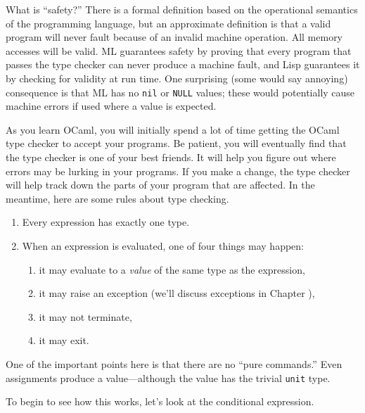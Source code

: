 What is ``safety?''  There is a formal definition based on the
operational semantics of the programming language, but an approximate
definition is that a valid program will never fault because of an
invalid machine operation.  All memory accesses will be valid.  ML
guarantees safety by proving that every program that passes the type
checker can never produce a machine fault, and Lisp guarantees it by
checking for validity at run time.  One surprising (some would say
annoying) consequence is that ML has no \hbox{\lstinline/nil/} or \hbox{\lstinline/NULL/}
values; these would potentially cause machine errors if used where
a value is expected.

As you learn OCaml, you will initially spend a lot of time getting the
OCaml type checker to accept your programs.  Be patient, you will
eventually find that the type checker is one of your best friends.  It
will help you figure out where errors may be lurking in your programs.
If you make a change, the type checker will help track down the parts
of your program that are affected.  In the meantime, here are some
rules about type checking.

\begin{enumerate}

\item{Every expression has exactly one type.}

\item{When an expression is evaluated, one of four things may happen:

   \begin{enumerate}
   \item{it may evaluate to a \emph{value} of the same type as the
      expression,}
   \item{it may raise an exception (we'll discuss exceptions in
      Chapter ),}
   \item{it may not terminate,}
   \item{it may exit.}
   \end{enumerate}}

\end{enumerate}
%
One of the important points here is that there are no ``pure
commands.''  Even assignments produce a value---although the value has
the trivial \texttt{unit} type.

To begin to see how this works, let's look at the conditional
expression.

